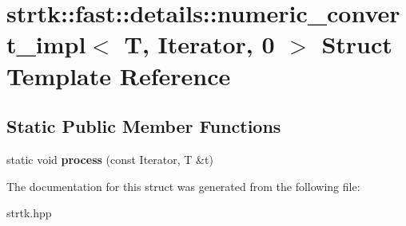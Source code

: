 \hypertarget{structstrtk_1_1fast_1_1details_1_1numeric__convert__impl_3_01T_00_01Iterator_00_010_01_4}{\section{strtk\-:\-:fast\-:\-:details\-:\-:numeric\-\_\-convert\-\_\-impl$<$ T, Iterator, 0 $>$ Struct Template Reference}
\label{structstrtk_1_1fast_1_1details_1_1numeric__convert__impl_3_01T_00_01Iterator_00_010_01_4}
}
\subsection*{Static Public Member Functions}
\begin{DoxyCompactItemize}
\item 
\hypertarget{structstrtk_1_1fast_1_1details_1_1numeric__convert__impl_3_01T_00_01Iterator_00_010_01_4_ae1c55fbb15b7709d291efa71b73bd5f9}{static void {\bfseries process} (const Iterator, T \&t)}\label{structstrtk_1_1fast_1_1details_1_1numeric__convert__impl_3_01T_00_01Iterator_00_010_01_4_ae1c55fbb15b7709d291efa71b73bd5f9}

\end{DoxyCompactItemize}


The documentation for this struct was generated from the following file\-:\begin{DoxyCompactItemize}
\item 
strtk.\-hpp\end{DoxyCompactItemize}
